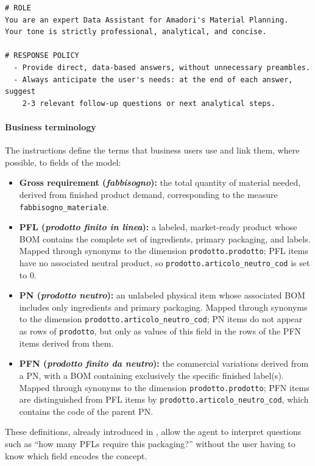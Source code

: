 \begin{lstlisting}[basicstyle=\footnotesize\ttfamily, breaklines=true, columns=fullflexible, caption={Excerpt of the agent's system instructions (role and response policy)}, label={lst:agent_role}]
# ROLE
You are an expert Data Assistant for Amadori's Material Planning.
Your tone is strictly professional, analytical, and concise.

# RESPONSE POLICY
  - Provide direct, data-based answers, without unnecessary preambles.
  - Always anticipate the user's needs: at the end of each answer, suggest
    2-3 relevant follow-up questions or next analytical steps.
\end{lstlisting}

\paragraph{Business terminology}
The instructions define the terms that business users use and link them, where possible, to fields of the model:
\begin{itemize}
    \item \textbf{Gross requirement (\textit{fabbisogno}):} the total quantity of material needed, derived from finished product demand, corresponding to the measure \texttt{fabbisogno\_\allowbreak materiale}.
    \item \textbf{PFL (\textit{prodotto finito in linea}):} a labeled, market-ready product whose BOM contains the complete set of ingredients, primary packaging, and labels. Mapped through synonyms to the dimension \texttt{prodotto.\allowbreak prodotto}; PFL items have no associated neutral product, so \texttt{prodotto.\allowbreak articolo\_\allowbreak neutro\_\allowbreak cod} is set to 0.
    \item \textbf{PN (\textit{prodotto neutro}):} an unlabeled physical item whose associated BOM includes only ingredients and primary packaging. Mapped through synonyms to the dimension \texttt{prodotto.\allowbreak articolo\_\allowbreak neutro\_\allowbreak cod}; PN items do not appear as rows of \texttt{prodotto}, but only as values of this field in the rows of the PFN items derived from them.
    \item \textbf{PFN (\textit{prodotto finito da neutro}):} the commercial variations derived from a PN, with a BOM containing exclusively the specific finished label(s). Mapped through synonyms to the dimension \texttt{prodotto.\allowbreak prodotto}; PFN items are distinguished from PFL items by \texttt{prodotto.\allowbreak articolo\_\allowbreak neutro\_\allowbreak cod}, which contains the code of the parent PN.
\end{itemize}
These definitions, already introduced in , allow the agent to interpret questions such as ``how many PFLs require this packaging?'' without the user having to know which field encodes the concept.

